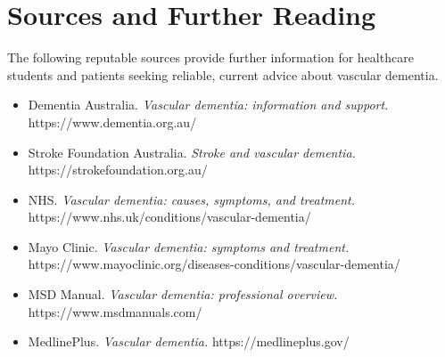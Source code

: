 \section*{Sources and Further Reading}
The following reputable sources provide further information for healthcare students and patients seeking reliable, current advice about vascular dementia.

\begin{itemize}
    \item Dementia Australia. \textit{Vascular dementia: information and support.} https://www.dementia.org.au/
    \item Stroke Foundation Australia. \textit{Stroke and vascular dementia.} https://strokefoundation.org.au/
    \item NHS. \textit{Vascular dementia: causes, symptoms, and treatment.} https://www.nhs.uk/conditions/vascular-dementia/
    \item Mayo Clinic. \textit{Vascular dementia: symptoms and treatment.} https://www.mayoclinic.org/diseases-conditions/vascular-dementia/
    \item MSD Manual. \textit{Vascular dementia: professional overview.} https://www.msdmanuals.com/
    \item MedlinePlus. \textit{Vascular dementia.} https://medlineplus.gov/
\end{itemize}
